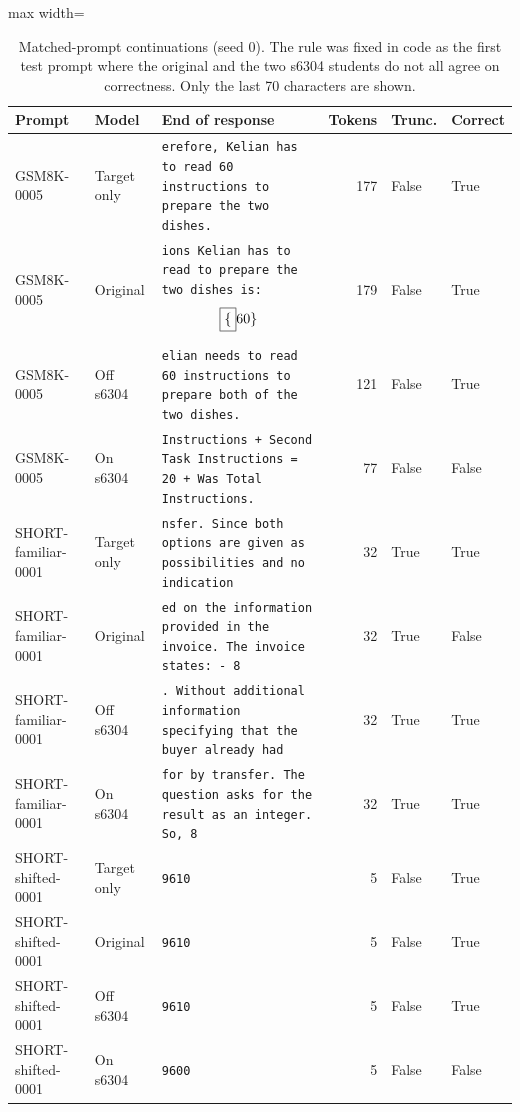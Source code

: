 \begin{table}[!htb]
\centering
\scriptsize
\setlength{\tabcolsep}{3.5pt}
\caption{Matched-prompt continuations (seed 0). The rule was fixed in code as the first test prompt where the original and the two s6304 students do not all agree on correctness. Only the last 70 characters are shown.}
\label{tab:t3cont}
\begin{adjustbox}{max width=\linewidth}
\begin{tabular}{llp{7.2cm}rll}
\toprule
Prompt & Model & End of response & Tokens & Trunc. & Correct \\
\midrule
GSM8K-0005 & Target only & \texttt{erefore, Kelian has to read 60 instructions to prepare the two dishes.} & 177 & False & True \\
GSM8K-0005 & Original & \texttt{ions Kelian has to read to prepare the two dishes is: \[ \boxed\{60\} \]} & 179 & False & True \\
GSM8K-0005 & Off s6304 & \texttt{elian needs to read 60 instructions to prepare both of the two dishes.} & 121 & False & True \\
GSM8K-0005 & On s6304 & \texttt{Instructions + Second Task Instructions = 20 + Was Total Instructions.} & 77 & False & False \\
SHORT-familiar-0001 & Target only & \texttt{nsfer. Since both options are given as possibilities and no indication} & 32 & True & True \\
SHORT-familiar-0001 & Original & \texttt{ed on the information provided in the invoice. The invoice states: - 8} & 32 & True & False \\
SHORT-familiar-0001 & Off s6304 & \texttt{. Without additional information specifying that the buyer already had} & 32 & True & True \\
SHORT-familiar-0001 & On s6304 & \texttt{for by transfer. The question asks for the result as an integer. So, 8} & 32 & True & True \\
SHORT-shifted-0001 & Target only & \texttt{9610} & 5 & False & True \\
SHORT-shifted-0001 & Original & \texttt{9610} & 5 & False & True \\
SHORT-shifted-0001 & Off s6304 & \texttt{9610} & 5 & False & True \\
SHORT-shifted-0001 & On s6304 & \texttt{9600} & 5 & False & False \\
\bottomrule
\end{tabular}
\end{adjustbox}
\end{table}
